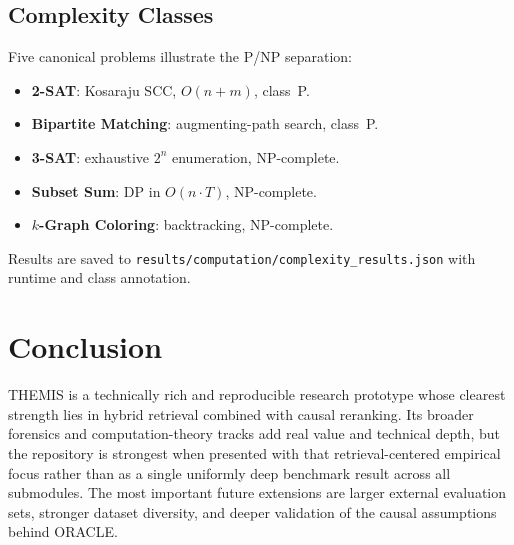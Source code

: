 \documentclass{article}
\begin{document}
\subsection{Complexity Classes}
Five canonical problems illustrate the P/NP separation:
\begin{itemize}
  \item \textbf{2-SAT}: Kosaraju SCC, $O(n+m)$, class~P.
  \item \textbf{Bipartite Matching}: augmenting-path search, class~P.
  \item \textbf{3-SAT}: exhaustive $2^n$ enumeration, NP-complete.
  \item \textbf{Subset Sum}: DP in $O(n \cdot T)$, NP-complete.
  \item \textbf{$k$-Graph Coloring}: backtracking, NP-complete.
\end{itemize}
Results are saved to \texttt{results/computation/complexity\_results.json} with runtime and class annotation.

\section{Conclusion}
THEMIS is a technically rich and reproducible research prototype whose clearest
strength lies in hybrid retrieval combined with causal reranking. Its broader
forensics and computation-theory tracks add real value and technical depth, but
the repository is strongest when presented with that retrieval-centered
empirical focus rather than as a single uniformly deep benchmark result across
all submodules. The most important future extensions are larger external
evaluation sets, stronger dataset diversity, and deeper validation of the
causal assumptions behind ORACLE.
\end{document}
